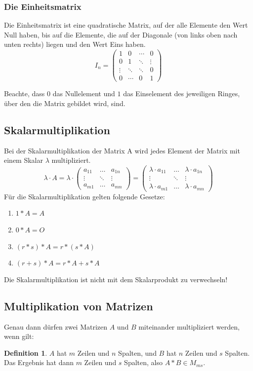 \documentclass[a4paper,10pt,DIV9, BCOR12mm, oneside,openright,openbib]{scrreprt}
\theoremstyle{definition}
\newtheorem{mydef}{Definition}[section]
\theoremstyle{plain}
\begin{document}
\subsubsection{Die Einheitsmatrix}
Die Einheitsmatrix ist eine quadratische Matrix, auf der alle Elemente den Wert Null haben, bis auf die Elemente, die auf der Diagonale (von links oben nach unten rechts) liegen und den Wert Eins haben. 
\[I_n = \begin{pmatrix} 1 & 0 & \cdots & 0 \\ 0 & 1 & \ddots & \vdots \\ \vdots & \ddots & \ddots & 0 \\ 0 & \cdots & 0 & 1 \end{pmatrix}\]
\begin{small}Beachte, dass $0$ das Nullelement und $1$ das Einselement des jeweiligen Ringes, über den die Matrix gebildet wird, sind.\end{small}
\subsection{Skalarmultiplikation}
Bei der Skalarmultiplikation der Matrix A wird jedes Element der Matrix mit einem Skalar $\lambda$ multipliziert.
\[\lambda \cdot A = \lambda \cdot \begin{pmatrix} a_{11} & \ldots & a_{1n} \\ \vdots & \ddots & \vdots \\ a_{m1} & \ldots & a_{mn} \end{pmatrix} = \begin{pmatrix} \lambda \cdot a_{11} & \ldots & \lambda \cdot a_{1n} \\ \vdots & \ddots & \vdots \\ \lambda \cdot a_{m1} & \ldots & \lambda \cdot a_{mn} \end{pmatrix}\]
Für die Skalarmultiplikation gelten folgende Gesetze:
\begin{enumerate}
 \item $1*A=A$
 \item $0*A=O$
 \item $(r*s)*A=r*(s*A)$
 \item $(r+s)*A=r*A+s*A$
\end{enumerate}
Die Skalarmultiplikation ist nicht mit dem Skalarprodukt zu verwechseln!

\subsection{Multiplikation von Matrizen}
Genau dann dürfen zwei Matrizen $A$ und $B$ miteinander multipliziert werden, wenn gilt:
\begin{mydef} \label{Multiplikationsvoraussetungen} 
$A$ hat $m$ Zeilen und $n$ Spalten, und $B$ hat $n$ Zeilen und $s$ Spalten. Das Ergebnis hat dann $m$ Zeilen und $s$ Spalten, also $A*B\in M_{ms}$.
\end{mydef}
\end{document}
